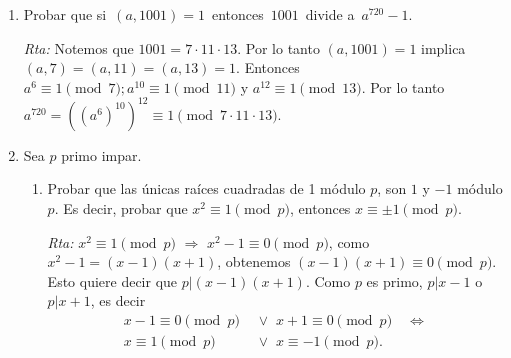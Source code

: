 \documentclass[a4paper,12pt,twoside,spanish,reqno]{amsbook}
\numberwithin{equation}{section}
\newcommand{\rta}{\noindent\textit{Rta: }}
\begin{document}
\begin{enumerate}
    
    
    
    
    
    
    \item Probar que si \,$(a,1001)=1$\, entonces \,$1001$\, divide a \,$a^{720}-1$.
    
    \rta Notemos que $1001=7\cdot11\cdot13$. Por lo tanto $(a, 1001) = 1$ implica $(a,7)=(a,11)=(a,13)=1$.
    Entonces $a^6\equiv1 \pmod{7}; a^{10}\equiv1 \pmod{11}$ y $ a^{12}\equiv1 \pmod{13}$.
    Por lo tanto $a^{720}=((a^6)^{10})^{12}\equiv 1 \pmod{7\cdot11\cdot13}$.
    
    \item Sea $p$ primo impar. 
\begin{enumerate} 
    \item\label{mr-a} Probar que las únicas raíces cuadradas de 1 módulo $p$,  son $1$ y $-1$ módulo $p$. Es decir, probar que $x^2 \equiv 1 \pmod{p}$, entonces  $x \equiv \pm1 \pmod{p}$.
    
    \rta   $x^2 \equiv 1 \pmod{p}$ $\Rightarrow$  $x^2 - 1 \equiv 0 \pmod{p}$, como $x^2 -1 = (x-1)(x+1)$, obtenemos  $ (x-1)(x+1) \equiv 0 \pmod{p}$. Esto quiere decir  que $p|  (x-1)(x+1)$. Como $p$  es primo, $p | x -1$ o $p| x +1$, es decir 
    \begin{align*}
        x -1 \equiv 0 \pmod{p} \;\;&\vee \;\; x +1 \equiv 0 \pmod{p} \quad \Leftrightarrow  \\
        x  \equiv 1 \pmod{p} \;\;&\vee \;\; x  \equiv -1 \pmod{p}.
    \end{align*}


\end{enumerate}
\end{enumerate}
\end{document}
